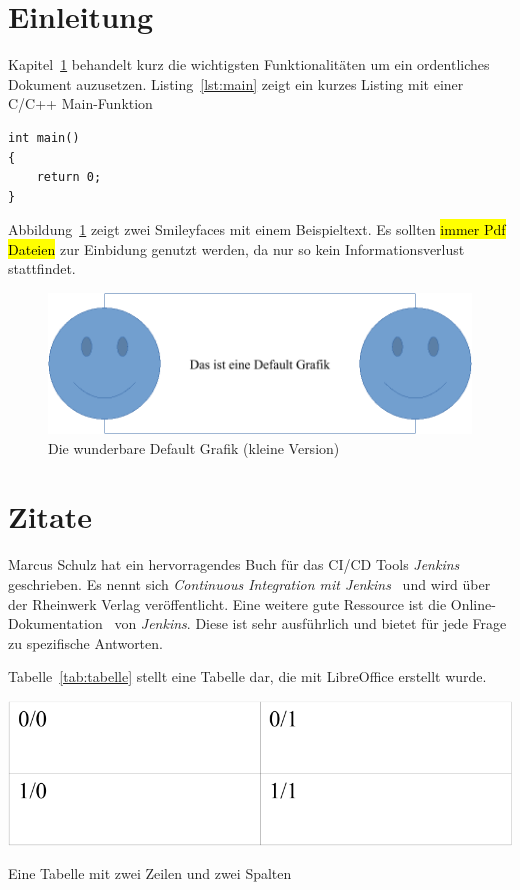\documentclass{article}
\begin{document}
\tableofcontents
\newpage

\section{Einleitung} \label{chap:einl}
Kapitel~\ref{chap:einl} behandelt kurz die wichtigsten Funktionalitäten um ein ordentliches Dokument auzusetzen.
Listing~\ref{lst:main} zeigt ein kurzes Listing mit einer C/C++ Main-Funktion

\begin{lstlisting}[caption=C/C++ Main-Funktion, captionpos=b, label=lst:main]
int main()
{
	return 0;
}
\end{lstlisting}

Abbildung~\ref{fig:defaultgrafik} zeigt zwei Smileyfaces mit einem Beispieltext. Es sollten \hl{immer Pdf Dateien} zur Einbidung genutzt werden, da nur so kein Informationsverlust stattfindet.
\begin{figure}[H]
\centering
\includegraphics[scale=0.9]{../graphics/defaultgraphic-crop} %
\caption{Die wunderbare Default Grafik (kleine Version)}
\label{fig:defaultgrafik}
\end{figure}

\section{Zitate}
Marcus Schulz hat ein hervorragendes Buch für das CI/CD Tools \textit{Jenkins} geschrieben. Es nennt sich \textit{Continuous Integration mit Jenkins}~\cite{Schulz} und wird über der Rheinwerk Verlag veröffentlicht.
Eine weitere gute Ressource ist die Online-Dokumentation~\cite{Jenkins} von \textit{Jenkins}. Diese ist sehr ausführlich und bietet für jede Frage zu spezifische Antworten.

Tabelle~\ref{tab:tabelle} stellt eine Tabelle dar, die mit LibreOffice erstellt wurde.

\begin{table}[H]
\centering
\includegraphics[scale=0.9]{../graphics/table-crop} %
\caption{Eine Tabelle mit zwei Zeilen und zwei Spalten}
\label{tab:tabelle}
\end{table}
\end{document}
